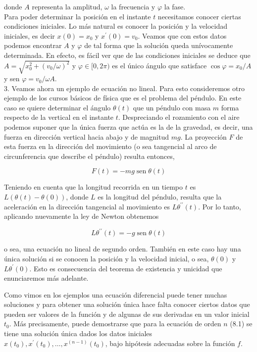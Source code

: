\documentclass[10pt]{book}
\begin{document}
donde $A$ representa la amplitud, $\omega$ la frecuencia y $\varphi$ la fase.\\
Para poder determinar la posición en el instante $t$ necesitamos conocer ciertas condiciones iniciales. Lo más natural es conocer la posición y la velocidad iniciales, es decir $x(0)=x_{0}$ y $x^{\prime}(0)=v_{0}$. Veamos que con estos datos podemos encontrar $A$ y $\varphi$ de tal forma que la solución queda unívocamente determinada. En efecto, es fácil ver que de las condiciones iniciales se deduce que $A=\sqrt{x_{0}^{2}+\left(v_{0} / \omega\right)^{2}}$ y $\varphi \in[0,2 \pi)$ es el único ángulo que satisface $\cos \varphi=x_{0} / A$ y sen $\varphi=v_{0} / \omega A$.\\
3. Veamos ahora un ejemplo de ecuación no lineal. Para esto consideremos otro ejemplo de los cursos básicos de física que es el problema del péndulo. En este caso se quiere determinar el ángulo $\theta(t)$ que un péndulo con masa $m$ forma respecto de la vertical en el instante $t$. Despreciando el rozamiento con el aire podemos suponer que la única fuerza que actúa es la de la gravedad, es decir, una fuerza en dirección vertical hacia abajo y de magnitud $m g$. La proyección $F$ de esta fuerza en la dirección del movimiento (o sea tangencial al arco de circunferencia que describe el péndulo) resulta entonces,

$$
F(t)=-m g \operatorname{sen} \theta(t)
$$

Teniendo en cuenta que la longitud recorrida en un tiempo $t$ es $L(\theta(t)-\theta(0))$, donde $L$ es la longitud del péndulo, resulta que la aceleración en la dirección tangencial al movimiento es $L \theta^{\prime \prime}(t)$. Por lo tanto, aplicando nuevamente la ley de Newton obtenemos

$$
L \theta^{\prime \prime}(t)=-g \operatorname{sen} \theta(t)
$$

o sea, una ecuación no lineal de segundo orden. También en este caso hay una única solución si se conocen la posición y la velocidad inicial, o sea, $\theta(0)$ y $L \theta^{\prime}(0)$. Esto es consecuencia del teorema de existencia y unicidad que enunciaremos más adelante.

Como vimos en los ejemplos una ecuación diferencial puede tener muchas soluciones y para obtener una solución única hace falta conocer ciertos datos que pueden ser valores de la función y de algunas de sus derivadas en un valor inicial $t_{0}$. Más precisamente, puede demostrarse que para la ecuación de orden $n$ (8.1) se tiene una solución única dados los datos iniciales $x\left(t_{0}\right), x^{\prime}\left(t_{0}\right), \ldots, x^{(n-1)}\left(t_{0}\right)$, bajo hipótesis adecuadas sobre la función $f$.
\end{document}
